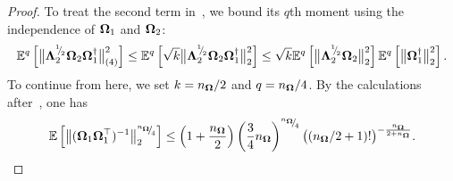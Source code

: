 \begin{proof}
To treat the second term in~, we bound 
its $q$th moment using the independence of $\boldsymbol{\Omega}_1$ and $\boldsymbol{\Omega}_2$:
    \begin{equation}
        \mathbb{E}^{q}\left[ \big\| \mtx{\Lambda}_2^{\sfrac{1}{2}} \mtx{\Omega}_2 \mtx{\Omega}_1^{\dagger} \big\|_{(4)}^2 \right]
        \leq \mathbb{E}^{q}\left[ \sqrt{k} \big\| \mtx{\Lambda}_2^{\sfrac{1}{2}} \mtx{\Omega}_2 \mtx{\Omega}_1^{\dagger} \big\| _2^2 \right]%
        \leq \sqrt{k} \mathbb{E}^{q}\left[ \big\| \mtx{\Lambda}_2^{\sfrac{1}{2}} \mtx{\Omega}_2  \big\|_2^2\right] \mathbb{E}^{q}\left[ \big\| \mtx{\Omega}_1^{\dagger} \big\|_2^2  \right].%
        \label{equ:nystrom-proof-processed-tail}
    \end{equation}
    To continue from here, we set $k = n_{\boldsymbol{\Omega}}/2$ and $q = n_{\boldsymbol{\Omega}}/4$. By the calculations after~\cite[Eqn~(B.7)]{tropp-2023-randomized-algorithms}, one has
    \begin{equation*}
     \mathbb{E}\left[ \big\| ( \mtx{\Omega}_1 \mtx{\Omega}_1^{\top} )^{-1} \big\|_2^{\sfrac{n_{\mtx{\Omega}}}{4}} \right]%
        \leq
        \left(1 + \frac{n_{\mtx{\Omega}}}{2}\right)
        \left( \frac{3}{4} n_{\mtx{\Omega}}\right)^{\sfrac{n_{\mtx{\Omega}}}{4}}
        \big( ( n_{\mtx{\Omega}} / 2 + 1)!\big)^{-\frac{n_{\mtx{\Omega}}}{2+n_{\mtx{\Omega}}}}.
    \end{equation*}

\end{proof}

